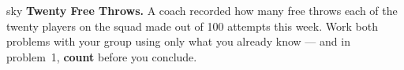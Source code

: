 \documentclass[12pt]{article}
\begin{document}

\vspace{0.02in}

\begin{headlinebox}{sky}
\textbf{Twenty Free Throws.} A coach recorded how many free throws each of the twenty players
on the squad made out of 100 attempts this week. Work both problems with your group using only
what you already know --- and in problem~1, \textbf{count} before you conclude.
\end{headlinebox}

\vspace{0.04in}
\end{document}
